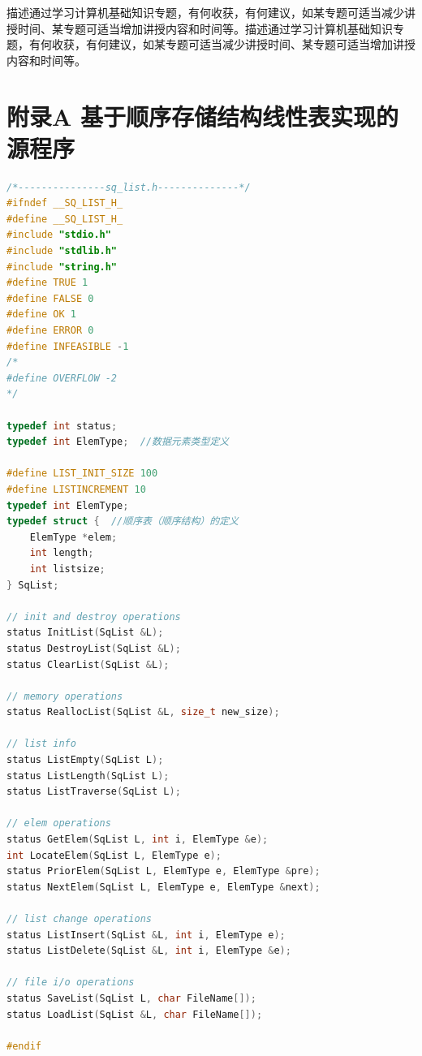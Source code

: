 \documentclass[supercite]{Experimental_Report}
\theoremstyle{definition}
\begin{document}
描述通过学习计算机基础知识专题，有何收获，有何建议，如某专题可适当减少讲授时间、某专题可适当增加讲授内容和时间等。描述通过学习计算机基础知识专题，有何收获，有何建议，如某专题可适当减少讲授时间、某专题可适当增加讲授内容和时间等。




\appendix

\section{附录A 基于顺序存储结构线性表实现的源程序}

\begin{lstlisting}[caption={$sq\_list.h$}, language=C++, frame=single]
/*---------------sq_list.h--------------*/
#ifndef __SQ_LIST_H_
#define __SQ_LIST_H_
#include "stdio.h"
#include "stdlib.h"
#include "string.h"
#define TRUE 1
#define FALSE 0
#define OK 1
#define ERROR 0
#define INFEASIBLE -1
/*
#define OVERFLOW -2
*/

typedef int status;
typedef int ElemType;  //数据元素类型定义

#define LIST_INIT_SIZE 100
#define LISTINCREMENT 10
typedef int ElemType;
typedef struct {  //顺序表（顺序结构）的定义
    ElemType *elem;
    int length;
    int listsize;
} SqList;

// init and destroy operations
status InitList(SqList &L);
status DestroyList(SqList &L);
status ClearList(SqList &L);

// memory operations
status ReallocList(SqList &L, size_t new_size);

// list info
status ListEmpty(SqList L);
status ListLength(SqList L);
status ListTraverse(SqList L);

// elem operations
status GetElem(SqList L, int i, ElemType &e);
int LocateElem(SqList L, ElemType e);
status PriorElem(SqList L, ElemType e, ElemType &pre);
status NextElem(SqList L, ElemType e, ElemType &next);

// list change operations
status ListInsert(SqList &L, int i, ElemType e);
status ListDelete(SqList &L, int i, ElemType &e);

// file i/o operations
status SaveList(SqList L, char FileName[]);
status LoadList(SqList &L, char FileName[]);

#endif
\end{lstlisting}
\end{document}
